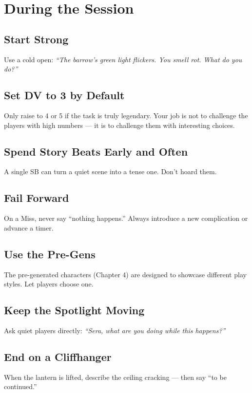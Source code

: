 \documentclass[11pt]{book}
\begin{document}
\section{During the Session}

\subsection*{Start Strong}
Use a cold open: \textit{``The barrow's green light flickers. You smell rot. What do you do?''}

\subsection*{Set DV to 3 by Default}
Only raise to 4 or 5 if the task is truly legendary. Your job is not to challenge the players with high numbers --- it is to challenge them with interesting choices.

\subsection*{Spend Story Beats Early and Often}
A single SB can turn a quiet scene into a tense one. Don't hoard them.

\subsection*{Fail Forward}
On a Miss, never say ``nothing happens.'' Always introduce a new complication or advance a timer.

\subsection*{Use the Pre-Gens}
The pre-generated characters (Chapter 4) are designed to showcase different play styles. Let players choose one.

\subsection*{Keep the Spotlight Moving}
Ask quiet players directly: \textit{``Sera, what are you doing while this happens?''}

\subsection*{End on a Cliffhanger}
When the lantern is lifted, describe the ceiling cracking --- then say ``to be continued.''
\end{document}
